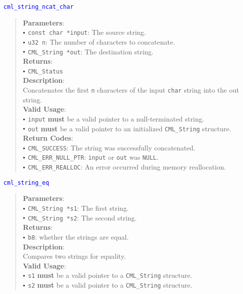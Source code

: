 \documentclass[a4paper,oneside,8pt]{extarticle}
\newcommand{\function}[1]{
  \noindent\textcolor{blue}{\texttt{#1}}
  \vspace{-0.3em}
}
\renewcommand{\dot}{\raisebox{0.3ex}{\scalebox{0.6}{$\bullet$}}}
\theoremstyle{definition}
\begin{document}
\function{cml\_string\_ncat\_char}
\begin{quote}
  \textbf{Parameters}: \\
  $\dot$ \texttt{const char *input}: The source string. \\
  $\dot$ \texttt{u32 n}: The number of characters to concatenate. \\
  $\dot$ \texttt{CML\_String *out}: The destination string. \\
  \textbf{Returns}: \\
  $\dot$ \texttt{CML\_Status} \\

  \vspace{-0.75em}
  \textbf{Description}: \\
  Concatenates the first \texttt{n} characters of the input \texttt{char} string into the out string. \\

  \vspace{-0.75em}
  \textbf{Valid Usage}: \\
  $\dot$ \texttt{input} \textbf{must} be a valid pointer to a null-terminated string. \\
  $\dot$ \texttt{out} \textbf{must} be a valid pointer to an initialized \texttt{CML\_String} structure. \\

  \vspace{-0.75em}
  \textbf{Return Codes}: \\
  $\dot$ \texttt{CML\_SUCCESS}: The string was successfully concatenated. \\
  $\dot$ \texttt{CML\_ERR\_NULL\_PTR}: \texttt{input} or \texttt{out} was \texttt{NULL}. \\
  $\dot$ \texttt{CML\_ERR\_REALLOC}: An error occurred during memory reallocation. \\
\end{quote}

\function{cml\_string\_eq}
\begin{quote}
  \textbf{Parameters}: \\
  $\dot$ \texttt{CML\_String *s1}: The first string. \\
  $\dot$ \texttt{CML\_String *s2}: The second string. \\
  \textbf{Returns}: \\
  $\dot$ \texttt{b8}: whether the strings are equal. \\

  \vspace{-0.75em}
  \textbf{Description}: \\
  Compares two strings for equality. \\

  \vspace{-0.75em}
  \textbf{Valid Usage}: \\
  $\dot$ \texttt{s1} \textbf{must} be a valid pointer to a \texttt{CML\_String} structure. \\
  $\dot$ \texttt{s2} \textbf{must} be a valid pointer to a \texttt{CML\_String} structure. \\
\end{quote}
\end{document}
